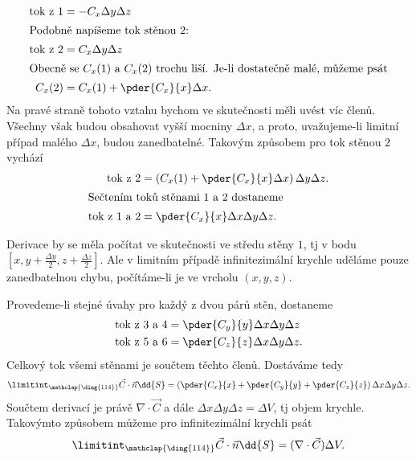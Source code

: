       \begin{align}
        \text{tok z 1} &= -C_x\Delta y \Delta z                                           \\
        \intertext{Podobně napíšeme tok stěnou $2$:}
        \text{tok z 2} &= C_x\Delta y \Delta z                                            \\
        \intertext{Obecně se $C_x(1)$ a $C_x(2)$ trochu liší. Je-li dostatečně malé, můžeme psát}
          C_x(2)        &= C_x(1) + \pder{C_x}{x}\Delta x.                             
      \end{align}            
      \noindent Na pravé straně tohoto vztahu bychom ve skutečnosti měli uvést víc členů. Všechny 
      však budou obsahovat vyšší mocniny $\Delta x$, a proto, uvažujeme-li limitní případ malého 
      $\Delta x$, budou zanedbatelné. Takovým způsobem pro tok stěnou $2$ vychází
      \begin{align}    
        \text{tok z 2} &= \left(C_x(1) + \pder{C_x}{x}\Delta x\right)\Delta y \Delta z.             \\
        \intertext{Sečtením toků stěnami $1$ a $2$ dostaneme}
        \text{tok z 1 a 2} &= \pder{C_x}{x}\Delta x\Delta y\Delta z.
      \end{align}      
      
      
      Derivace by se měla počítat ve skutečnosti ve středu stěny $1$, tj v bodu $[x, y+\frac{\Delta 
      y}{2}, z + \frac{\Delta z}{2}]$. Ale v limitním případě infinitezimální krychle uděláme pouze 
      zanedbatelnou chybu, počítáme-li je ve vrcholu $(x,y,z)$.
      
      Provedeme-li stejné úvahy pro každý z dvou párů stěn, dostaneme    
      \begin{align*}
        \text{tok z 3 a 4} &= \pder{C_y}{y}\Delta x\Delta y\Delta z   \\ 
        \text{tok z 5 a 6} &= \pder{C_z}{z}\Delta x\Delta y\Delta z.
      \end{align*}       
      Celkový tok všemi stěnami je součtem těchto členů. Dostáváme tedy
      \begin{equation}
        \limitint_{\mathclap{\substack{\text{\ding{114}}}}}\vec{C}\cdot\vec{n}\dd{S}
          = \left(\pder{C_x}{x}+\pder{C_y}{y} +
            \pder{C_z}{z}\right)\Delta x\Delta y \Delta z.
      \end{equation}
      Součtem derivací je právě $\nabla\cdot\vec{C}$ a dále $\Delta x\Delta y \Delta z = \Delta V$, 
      tj objem krychle. Takovýmto způsobem můžeme pro infinitezimální krychli psát
      \begin{equation}
        \limitint_{\mathclap{\substack{\text{\ding{114}}}}}\vec{C}\cdot\vec{n}\dd{S}
          = (\nabla\cdot\vec{C})\Delta V.       \label{fyz:eq_gauss1}
      \end{equation}
      
